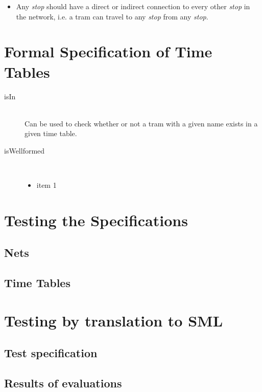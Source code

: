 \documentclass[a4]{article}
\begin{document}
\begin{description}
\begin{itemize}
            \item Any \emph{stop} should have a direct or indirect connection to every other \emph{stop} in the network, i.e. a tram can travel to any \emph{stop} from any \emph{stop}.
        \end{itemize}
\end{description}

\section{Formal Specification of Time Tables}



\begin{description}
    \item[isIn] \hfill \\ Can be used to check whether or not a tram with a given name exists in a given time table.
    \item[isWellformed] \hfill \\ 
        \begin{itemize}
            \item item 1
        \end{itemize}
\end{description}

\section{Testing the Specifications}

\subsection{Nets}

%

\subsection{Time Tables}

%

\section{Testing by translation to SML}

\subsection{Test specification}

\subsection{Results of evaluations}
\end{document}
